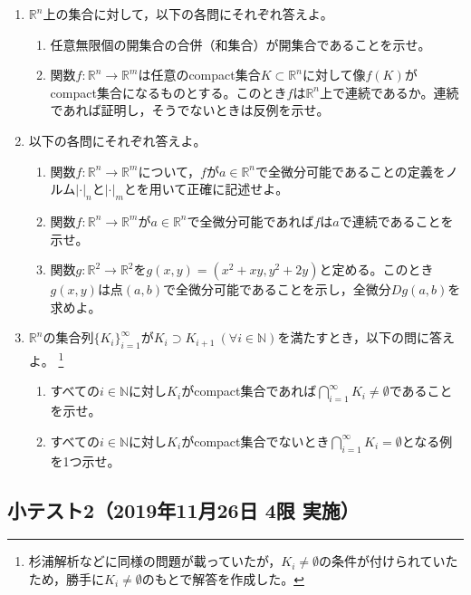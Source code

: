 \documentclass[dvipdfmx,a4j,10pt]{jsarticle}
\theoremstyle{mystyle1}
\theoremstyle{mystyle2}
\begin{document}
\begin{enumerate}
    \item $\mathbb{R}^n$上の集合に対して，以下の各問にそれぞれ答えよ。
        \begin{enumerate}\renewcommand{\labelenumii}{(\arabic{enumii})}
            \item 任意無限個の開集合の合併（和集合）が開集合であることを示せ。
            \item 関数$f:\mathbb{R}^n\to\mathbb{R}^m$は任意のcompact集合$K\subset\mathbb{R}^n$に対して像$f(K)$がcompact集合になるものとする。このとき$f$は$\mathbb{R}^n$上で連続であるか。連続であれば証明し，そうでないときは反例を示せ。
        \end{enumerate}
    \item 以下の各問にそれぞれ答えよ。
        \begin{enumerate}\renewcommand{\labelenumii}{(\arabic{enumii})}
            \item 関数$f:\mathbb{R}^n\to\mathbb{R}^m$について，$f$が$a\in\mathbb{R}^n$で全微分可能であることの定義をノルム$|\cdot|_n$と$|\cdot|_m$とを用いて正確に記述せよ。
            \item 関数$f:\mathbb{R}^n\to\mathbb{R}^m$が$a\in\mathbb{R}^n$で全微分可能であれば$f$は$a$で連続であることを示せ。
            \item 関数$g:\mathbb{R}^2\to\mathbb{R}^2$を$g(x,y)=(x^2+xy,y^2+2y)$と定める。このとき$g(x,y)$は点$(a,b)$で全微分可能であることを示し，全微分$Dg(a,b)$を求めよ。
        \end{enumerate}
    \item $\mathbb{R}^n$の集合列$\{K_i\}_{i=1}^\infty$が$K_i\supset K_{i+1}\ (\forall i\in\mathbb{N})$を満たすとき，以下の問に答えよ。
    \footnote{杉浦解析などに同様の問題が載っていたが，$K_i\neq\emptyset$の条件が付けられていたため，勝手に$K_i\neq\emptyset$のもとで解答を作成した。}
        \begin{enumerate}\renewcommand{\labelenumii}{(\arabic{enumii})}
            \item すべての$i\in\mathbb{N}$に対し$K_i$がcompact集合であれば$\displaystyle\bigcap_{i=1}^\infty K_i\neq\emptyset$であることを示せ。
            \item すべての$i\in\mathbb{N}$に対し$K_i$がcompact集合でないとき$\displaystyle\bigcap_{i=1}^\infty K_i=\emptyset$となる例を1つ示せ。
        \end{enumerate}
\end{enumerate}

\subsection{小テスト2（2019年11月26日 4限 実施）}
\end{document}
